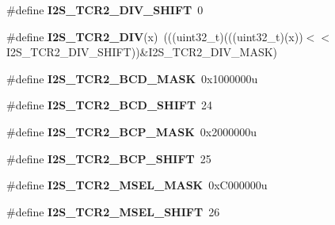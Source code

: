 \begin{DoxyCompactItemize}
\item 
\#define {\bfseries I2\+S\+\_\+\+T\+C\+R2\+\_\+\+D\+I\+V\+\_\+\+S\+H\+I\+FT}~0\hypertarget{group__I2S__Register__Masks_gad553f8b1c1cc03ded483d997640b410a}{}\label{group__I2S__Register__Masks_gad553f8b1c1cc03ded483d997640b410a}

\item 
\#define {\bfseries I2\+S\+\_\+\+T\+C\+R2\+\_\+\+D\+IV}(x)~(((uint32\+\_\+t)(((uint32\+\_\+t)(x))$<$$<$I2\+S\+\_\+\+T\+C\+R2\+\_\+\+D\+I\+V\+\_\+\+S\+H\+I\+FT))\&I2\+S\+\_\+\+T\+C\+R2\+\_\+\+D\+I\+V\+\_\+\+M\+A\+SK)\hypertarget{group__I2S__Register__Masks_ga89a576437056ff39e6a6e0474cbd8371}{}\label{group__I2S__Register__Masks_ga89a576437056ff39e6a6e0474cbd8371}

\item 
\#define {\bfseries I2\+S\+\_\+\+T\+C\+R2\+\_\+\+B\+C\+D\+\_\+\+M\+A\+SK}~0x1000000u\hypertarget{group__I2S__Register__Masks_gacd5946c8455382794be20e9454c7d688}{}\label{group__I2S__Register__Masks_gacd5946c8455382794be20e9454c7d688}

\item 
\#define {\bfseries I2\+S\+\_\+\+T\+C\+R2\+\_\+\+B\+C\+D\+\_\+\+S\+H\+I\+FT}~24\hypertarget{group__I2S__Register__Masks_ga2c6578a7b0e95314b9211083cd31494e}{}\label{group__I2S__Register__Masks_ga2c6578a7b0e95314b9211083cd31494e}

\item 
\#define {\bfseries I2\+S\+\_\+\+T\+C\+R2\+\_\+\+B\+C\+P\+\_\+\+M\+A\+SK}~0x2000000u\hypertarget{group__I2S__Register__Masks_gacd80d1c94434950d1e8bd33024b04018}{}\label{group__I2S__Register__Masks_gacd80d1c94434950d1e8bd33024b04018}

\item 
\#define {\bfseries I2\+S\+\_\+\+T\+C\+R2\+\_\+\+B\+C\+P\+\_\+\+S\+H\+I\+FT}~25\hypertarget{group__I2S__Register__Masks_gaafb7626321ba09185e45c9136b804732}{}\label{group__I2S__Register__Masks_gaafb7626321ba09185e45c9136b804732}

\item 
\#define {\bfseries I2\+S\+\_\+\+T\+C\+R2\+\_\+\+M\+S\+E\+L\+\_\+\+M\+A\+SK}~0x\+C000000u\hypertarget{group__I2S__Register__Masks_ga69d35574d74902b5a5dac263afe83957}{}\label{group__I2S__Register__Masks_ga69d35574d74902b5a5dac263afe83957}

\item 
\#define {\bfseries I2\+S\+\_\+\+T\+C\+R2\+\_\+\+M\+S\+E\+L\+\_\+\+S\+H\+I\+FT}~26\hypertarget{group__I2S__Register__Masks_ga3f2208b190e1f9a951d300e726f6df76}{}\label{group__I2S__Register__Masks_ga3f2208b190e1f9a951d300e726f6df76}


\end{DoxyCompactItemize}
